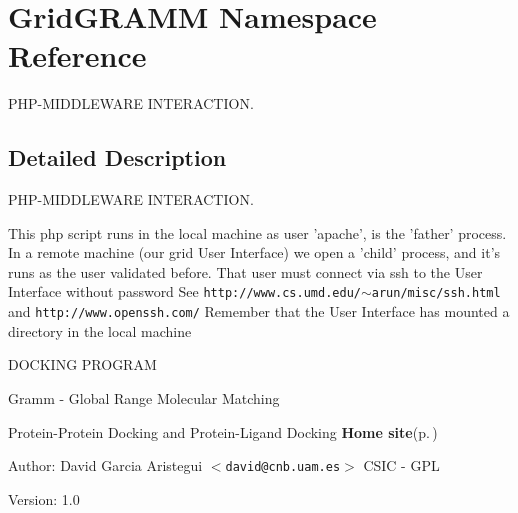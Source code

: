 \section{Grid\-GRAMM Namespace Reference}
\label{namespaceGridGRAMM}
PHP-MIDDLEWARE INTERACTION.  




\subsection{Detailed Description}
PHP-MIDDLEWARE INTERACTION. 

This php script runs in the local machine as user 'apache', is the 'father' process. In a remote machine (our grid User Interface) we open a 'child' process, and it's runs as the user validated before. That user must connect via ssh to the User Interface without password See {\tt http://www.cs.umd.edu/$\sim$arun/misc/ssh.html} and {\tt http://www.openssh.com/} Remember that the User Interface has mounted a directory in the local machine

DOCKING PROGRAM

Gramm - Global Range Molecular Matching

Protein-Protein Docking and Protein-Ligand Docking {\bf Home site}{\rm (p.\,\pageref{})}

\begin{Desc}
\item[Author:]David Garcia Aristegui $<${\tt david@cnb.uam.es}$>$  CSIC - GPL \end{Desc}
\begin{Desc}
\item[Version:]1.0 \end{Desc}


